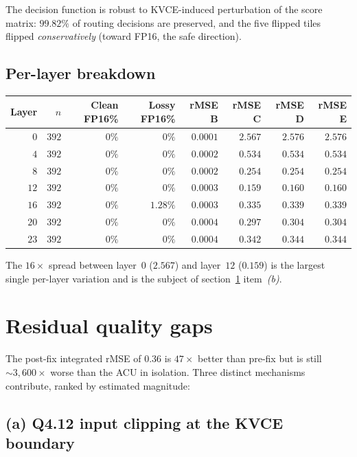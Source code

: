 \documentclass[11pt]{article}
\begin{document}
The decision function is robust to KVCE-induced perturbation of
the score matrix: $99.82\%$ of routing decisions are preserved,
and the five flipped tiles flipped \emph{conservatively}
(toward FP16, the safe direction).

\subsection{Per-layer breakdown}

\begin{center}
\renewcommand{\arraystretch}{1.15}
\setlength{\tabcolsep}{4pt}
\begin{tabular}{@{}rrrrrrrr@{}}
\toprule
Layer & $n$ & Clean FP16\% & Lossy FP16\% & rMSE B & rMSE C & rMSE D & rMSE E \\
\midrule
$0$  & $392$ & $0\%$ & $0\%$    & $0.0001$ & $2.567$ & $2.576$ & $2.576$ \\
$4$  & $392$ & $0\%$ & $0\%$    & $0.0002$ & $0.534$ & $0.534$ & $0.534$ \\
$8$  & $392$ & $0\%$ & $0\%$    & $0.0002$ & $0.254$ & $0.254$ & $0.254$ \\
$12$ & $392$ & $0\%$ & $0\%$    & $0.0003$ & $0.159$ & $0.160$ & $0.160$ \\
$16$ & $392$ & $0\%$ & $1.28\%$ & $0.0003$ & $0.335$ & $0.339$ & $0.339$ \\
$20$ & $392$ & $0\%$ & $0\%$    & $0.0004$ & $0.297$ & $0.304$ & $0.304$ \\
$23$ & $392$ & $0\%$ & $0\%$    & $0.0004$ & $0.342$ & $0.344$ & $0.344$ \\
\bottomrule
\end{tabular}
\end{center}

The $16\times$ spread between layer~$0$ ($2.567$) and layer~$12$
($0.159$) is the largest single per-layer variation and is the
subject of section~\ref{sec:gaps} item~\textit{(b)}.

\section{Residual quality gaps}
\label{sec:gaps}

The post-fix integrated rMSE of $0.36$ is $47\times$ better than
pre-fix but is still $\sim 3{,}600\times$ worse than the ACU in
isolation. Three distinct mechanisms contribute, ranked by
estimated magnitude:

\subsection*{(a) Q4.12 input clipping at the KVCE boundary}
\end{document}
